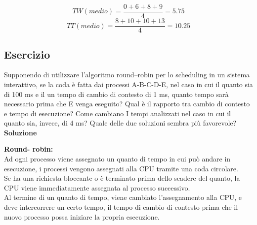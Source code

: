 \documentclass{article}
\begin{document}
\[TW(medio) = \frac{0+6+8+9}{4} = 5.75 \]
\[TT(medio) = \frac{8+10+10+13}{4} = 10.25 \]

\subsection{Esercizio}
Supponendo di utilizzare l’algoritmo round–robin per lo scheduling in un sistema interattivo, se la coda è fatta dai processi A-B-C-D-E, nel caso in cui il quanto sia di 100 ms e il un tempo di cambio di contesto di 1 ms, quanto tempo sarà necessario prima che E venga eseguito? Qual è il rapporto tra cambio di contesto e tempo di esecuzione?
Come cambiano I tempi analizzati nel caso in cui il quanto sia, invece, di 4 ms?
Quale delle due soluzioni sembra più favorevole?
\vskip 0.5cm
\textbf{Soluzione}
\vskip 0.5cm

\textbf{Round- robin:}\\
Ad ogni processo viene assegnato un quanto di tempo in cui può andare in esecuzione, i processi vengono assegnati alla CPU tramite una coda circolare.\\
Se ha una richiesta bloccante o è terminato prima dello scadere del quanto, la CPU viene immediatamente assegnata al processo successivo.\\
Al termine di un quanto di tempo, viene cambiato l’assegnamento alla CPU, e deve intercorrere un certo tempo, il tempo di cambio di contesto prima che il nuovo processo possa iniziare la propria esecuzione.
\end{document}
